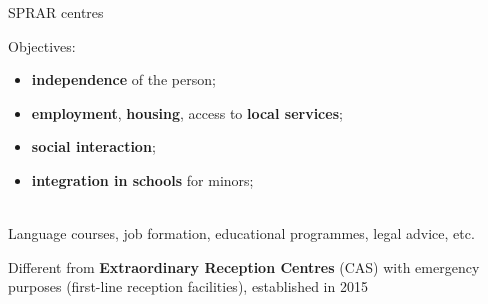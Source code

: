 \documentclass[xcolor={dvipsnames}]{beamer}
\begin{document}
\begin{frame}{SPRAR centres}

\fontsize{9}{7.2}\selectfont
Objectives: \\

\vspace{10}

\begin{itemize}
    \item \textbf{independence} of the person; \\
    \vspace{5}
    \item \textbf{employment}, \textbf{housing}, access to \textbf{local services}; \\
    \vspace{5}
    \item \textbf{social interaction};
    \\
    \vspace{5}
    \item \textbf{integration in schools} for minors;
\end{itemize} \\
\vspace{10}
\justifying
Language courses, job formation, educational programmes, legal advice, etc. \citep{cittalia2022} \\
\vspace{10}

Different from \textbf{Extraordinary Reception Centres} (CAS) with emergency purposes (first-line reception facilities), established in 2015 \citep{ricardguay2019}
\end{frame}
\end{document}

